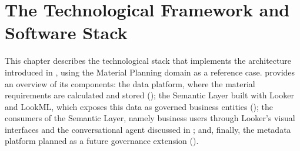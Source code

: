 
\chapter{The Technological Framework and Software Stack}
\label{chap:techstack}

This chapter describes the technological stack that implements the architecture introduced in , using the Material Planning domain as a reference case.
 provides an overview of its components: the data platform, where the material requirements are calculated and stored ();
the Semantic Layer built with Looker and LookML, which exposes this data as governed business entities ();
the consumers of the Semantic Layer, namely business users through Looker's visual interfaces and the conversational agent discussed in ;
and, finally, the metadata platform planned as a future governance extension ().

